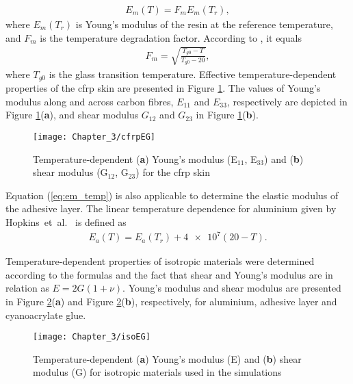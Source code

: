 \documentclass[11pt,a4paper,final]{report}
\theoremstyle{plain}
\begin{document}
\begin{eqnarray}
	E_m(T)=F_m E_{m}(T_r),
	\label{eq:factor_temp}
\end{eqnarray}
where \(E_{m}(T_r)\) is Young’s modulus of the resin at the reference temperature, and \(F_m\) is the temperature degradation factor.
According to \cite{chamis1983simplified}, it equals
\begin{eqnarray}
F_m=\sqrt{\frac{T_{g0}-T}{T_{g0}-20}},
\label{eq:em_temp}
\end{eqnarray}
where \(T_{g0}\) is the glass transition temperature.
Effective temperature-dependent properties of the \ac{cfrp} skin are presented in Figure \ref{fig:cfrpEG}.
The values of Young's modulus along and across carbon fibres, \(E_{11}\) and \(E_{33}\), respectively are depicted in Figure \ref{fig:cfrpEG}(\textbf{a}), and shear modulus \(G_{12}\) and \(G_{23}\) in Figure \ref{fig:cfrpEG}(\textbf{b}).

\begin{figure}
	\begin{center}
		\texttt{[image: Chapter\_3/cfrpEG]}
	\end{center}
	\caption{Temperature-dependent (\textbf{a}) Young's modulus (E\(_{11}\), E\(_{33}\)) and (\textbf{b}) shear modulus (G\(_{12}\), G\(_{23}\)) for the \acs{cfrp} skin}
	\label{fig:cfrpEG}
\end{figure}

Equation (\ref{eq:em_temp}) is also applicable to determine the elastic modulus of the adhesive layer.
The linear temperature dependence for aluminium given by Hopkins~et~al.~\cite{hopkins2012extreme} is defined as
\begin{eqnarray}
	E_a(T)=E_a(T_{r})+\num{4e7}(20-T).
	\label{eq:aluminium_temp}
\end{eqnarray}

Temperature-dependent properties of isotropic materials were determined according to the formulas and the fact that shear and Young's modulus are in relation as \(E=2G(1+\nu)\).
Young's modulus and shear modulus are presented in Figure \ref{fig:isoEG}(\textbf{a}) and Figure \ref{fig:isoEG}(\textbf{b}), respectively, for aluminium, adhesive layer and cyanoacrylate glue.
\begin{figure}
	\begin{center}
		\texttt{[image: Chapter\_3/isoEG]}
	\end{center}
	\caption{Temperature-dependent (\textbf{a}) Young's modulus (E) and (\textbf{b}) shear modulus (G) for isotropic materials used in the simulations}
	\label{fig:isoEG}
\end{figure}
\end{document}
